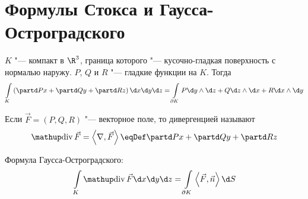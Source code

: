 \section{Формулы Стокса и Гаусса-Остроградского}

\begin{theorem}
	$K$ "--- компакт в $\R^3$, граница которого "--- кусочно-гладкая поверхность с нормалью наружу.
	$P$, $Q$ и $R$ "--- гладкие функции на $K$.
	Тогда
	\[
		\int\limits_K \left(\partd Px + \partd Qy + \partd Rz\right) \d x \d y \d z
		= \int\limits_{\partial K} P \d y \wedge \d z + Q \d z \wedge \d x + R \d x \wedge \d y
	\]
\end{theorem}
\begin{Def}
	Если $\vec F = (P, Q, R)$ "--- векторное поле, то дивергенцией называют
	\[ \Div \vec F = \left<\nabla, \vec F\right> \eqDef \partd Px + \partd Qy + \partd Rz \]
\end{Def}
\begin{Rem}
	Формула Гаусса-Остроградского:
	\[
		\int\limits_K \Div \vec F \d x \d y \d z = \int\limits_{\partial K} \left<\vec F, \vec n\right> \d S
	\]
\end{Rem}

